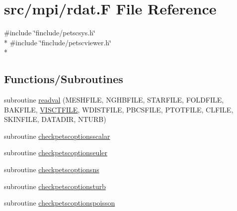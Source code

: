 \hypertarget{mpi_2rdat_8_f}{\section{src/mpi/rdat.F File Reference}
\label{mpi_2rdat_8_f}
}
{\ttfamily \#include \char`\"{}finclude/petscsys.\-h\char`\"{}}\\*
{\ttfamily \#include \char`\"{}finclude/petscviewer.\-h\char`\"{}}\\*
\subsection*{Functions/\-Subroutines}
\begin{DoxyCompactItemize}
\item 
subroutine \hyperlink{mpi_2rdat_8_f_add2908519bdf87b4bede100dbf9c7162}{readval} (M\-E\-S\-H\-F\-I\-L\-E, N\-G\-H\-B\-F\-I\-L\-E, S\-T\-A\-R\-F\-I\-L\-E, F\-O\-L\-D\-F\-I\-L\-E, B\-A\-K\-F\-I\-L\-E, \hyperlink{backup_8com_a95c1296e8e0de833d5ad9c330b97f734}{V\-I\-S\-C\-T\-F\-I\-L\-E}, W\-D\-I\-S\-T\-F\-I\-L\-E, P\-B\-C\-S\-F\-I\-L\-E, P\-T\-O\-T\-F\-I\-L\-E, C\-L\-F\-I\-L\-E, S\-K\-I\-N\-F\-I\-L\-E, D\-A\-T\-A\-D\-I\-R, N\-T\-U\-R\-B)
\item 
subroutine \hyperlink{mpi_2rdat_8_f_a7d377a7825e28a8cae47ecce4b8a3498}{checkpetscoptionsscalar}
\item 
subroutine \hyperlink{mpi_2rdat_8_f_a9280e83708ea9e0a97164b0e71143d8d}{checkpetscoptionseuler}
\item 
subroutine \hyperlink{mpi_2rdat_8_f_ab146cfe621395692c477e2c9f80845c2}{checkpetscoptionsns}
\item 
subroutine \hyperlink{mpi_2rdat_8_f_aa6622b7729ba6c3d580c36153e818f87}{checkpetscoptionsturb}
\item 
subroutine \hyperlink{mpi_2rdat_8_f_a70b374c85cb4298fd2513b3f5ebd2f43}{checkpetscoptionspoisson}
\end{DoxyCompactItemize}


